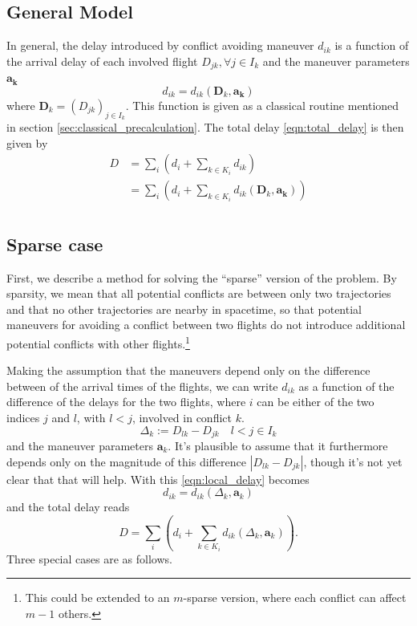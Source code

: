 \documentclass{article}
\begin{document}
\subsection{General Model}
In general, the delay introduced by conflict avoiding maneuver $d_{ik}$ is a
function of the arrival delay of each involved flight $D_{jk}, \forall j \in
I_k$ and the maneuver parameters $\mathbf{a_k}$ \begin{equation}
\label{eqn:local_delay}
    d_{ik} = d_{ik}(\mathbf D_{k}, \mathbf{a_k}) 
\end{equation}
where $\mathbf D_k = (D_{jk})_{j \in I_k}$.
This function is given as a classical routine mentioned in section \ref{sec:classical_precalculation}.
The total delay \eqref{eqn:total_delay} is then given by
\begin{align*}
    D &= \sum_i \left(d_i + \sum_{k\in K_i} d_{ik}\right) \\
      &= \sum_i \left(d_i + \sum_{k\in K_i} d_{ik}(\mathbf D_{k}, \mathbf{a_k})\right) \\
\end{align*}

\subsection{Sparse case}
First, we describe a method for solving the ``sparse'' version of the problem.
By sparsity, we mean that all potential conflicts are between only two
trajectories and that no other trajectories are nearby in spacetime, so that
potential maneuvers for avoiding a conflict between two flights do not
introduce additional potential conflicts with other flights.\footnote{This
could be extended to an $m$-sparse version, where each conflict can affect
$m-1$ others.}

Making the assumption that the maneuvers depend only on the difference
between of the arrival times of the flights, 
we can write $d_{ik}$ as a function of the difference of the delays 
for the two flights, where $i$ can be either of the two indices $j$ and $l$, 
with $l<j$, involved in conflict $k$.
\begin{equation*}
    \Delta_{k} := D_{lk} - D_{jk} \quad l < j \in I_k
\end{equation*}
and the maneuver parameters $\mathbf{a}_k$.
It's plausible to assume that it furthermore depends only on the magnitude of this difference $|D_{lk} - D_{jk}|$, though it's not yet clear that that will help.
With this \eqref{eqn:local_delay} becomes
\begin{equation*}
    d_{ik} = d_{ik}(\Delta_{k}, \mathbf{a}_k) 
\end{equation*}
and the total delay reads
\begin{equation*}
    D = \sum_i \left(d_i + \sum_{k\in K_i} d_{ik} (\Delta_k, \mathbf{a}_k)\right).
\end{equation*}
Three special cases are as follows. 
\end{document}
